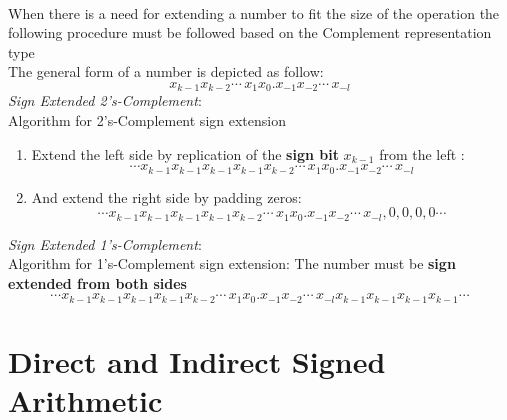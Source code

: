 \paragraph{}
When there is a need for extending a number to fit the size of the operation the following procedure must be followed based on the Complement representation type\\
The general form of a number is depicted as follow:
\[
	x_{k-1}x_{k-2}\cdots\,x_{1}x_{0}.x_{-1}x_{-2}\cdots\,x_{-l}
\]
\emph{Sign Extended 2's-Complement}:\\
Algorithm for 2's-Complement sign extension
\begin{enumerate}
	\item Extend the left side by replication of the \textbf{sign bit} \(x_{k-1}\) from the left :
	\[
			\cdots 	x_{k-1} 	x_{k-1} 	x_{k-1} 	x_{k-1}x_{k-2} \cdots\,x_{1}x_{0}.x_{-1}x_{-2}\cdots\,x_{-l}
	\]
	\item And  extend the right side by padding zeros:
	\[
			\cdots 	x_{k-1} 	x_{k-1} 	x_{k-1} 	x_{k-1}x_{k-2} \cdots\,x_{1}x_{0}.x_{-1}x_{-2}\cdots\,x_{-l},0,0,0,0\cdots
	\] 
\end{enumerate}
\emph{Sign Extended 1's-Complement}:\\
Algorithm for 1's-Complement sign extension:
The number must be \textbf{sign extended from both sides}
\[
	\cdots 	x_{k-1} 	x_{k-1} 	x_{k-1} 	x_{k-1}x_{k-2} \cdots\,x_{1}x_{0}.x_{-1}x_{-2}\cdots\,x_{-l}x_{k-1} x_{k-1} x_{k-1} x_{k-1} \cdots
\]
\section{Direct and Indirect Signed Arithmetic}
